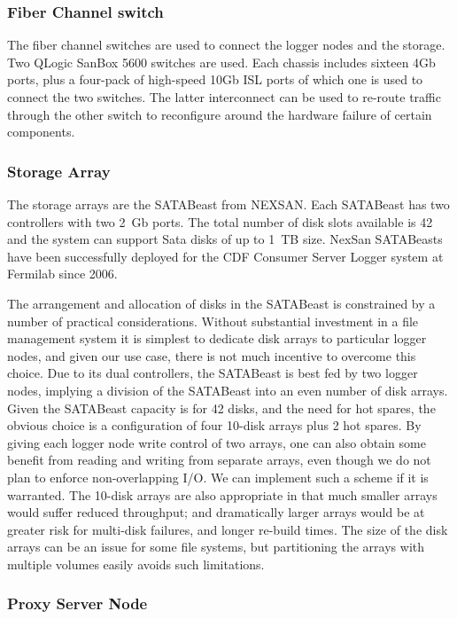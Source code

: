 \subsubsection{Fiber Channel switch}

The fiber channel switches are used to connect the logger nodes and the storage. 
Two QLogic SanBox 5600 switches are used. 
Each chassis includes sixteen 4Gb ports, plus a four-pack of high-speed 10Gb ISL ports 
of which one is used to connect the two switches.
The latter interconnect can be used to re-route traffic through the other switch
to reconfigure around the hardware failure of certain components.

\subsubsection{Storage Array}

The storage arrays are the SATABeast from NEXSAN. 
Each SATABeast has two controllers with two 2~Gb ports.
The total number of disk slots available is 42 and the system can support Sata disks 
of up to 1~TB size. 
NexSan SATABeasts have been successfully deployed for the CDF Consumer Server Logger system 
at Fermilab since 2006.

The arrangement and allocation of disks in the SATABeast is constrained by a number
of practical considerations.
Without substantial investment in a file management system it is simplest
to dedicate disk arrays to particular logger nodes, and given our use case, 
there is not much incentive to overcome this choice.
Due to its dual controllers, the SATABeast is best fed by two logger nodes,
implying a division of the SATABeast into an even number of disk arrays.
Given the  SATABeast capacity is for 42 disks, and the need for hot spares, 
the obvious choice is a configuration of four 10-disk arrays plus 2 hot spares.
By giving each logger node write control of two arrays, one can also obtain some benefit
from reading and writing from separate arrays, even though we do not plan
to enforce non-overlapping I/O. We can implement such a scheme if it is warranted.
The 10-disk arrays are also appropriate in that much smaller arrays would
suffer reduced throughput; and dramatically larger arrays would be at greater
risk for multi-disk failures, and longer re-build times.
The size of the disk arrays can be an issue for some file systems, 
but partitioning the arrays with multiple volumes easily avoids such limitations.

\subsubsection{Proxy Server Node}

